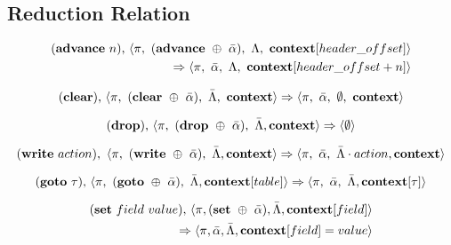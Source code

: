 \documentclass{article}
\begin{document}
\subsection{Reduction Relation}
\setlength{\mathindent}{0pt}
\begin{equation}
\begin{split}
  (\textbf{\textrm{advance}} \ n)\textrm{,} \ \langle \pi, \ (\textrm{\textbf{advance}} \ \oplus \ \bar \alpha), \ \Lambda,
  \ \textrm{\textbf{context}}[header\_offset] \rangle \\ \Rightarrow \langle \pi, \ \bar \alpha, \ \Lambda,
  \ \textrm{\textbf{context}}[header\_offset + n] \rangle
\end{split}
\end{equation}

\begin{equation}
  (\textrm{\textbf{clear}}) \textrm{,} \ \langle \pi, \ (\textbf{\textrm{clear}} \ \oplus \ \bar \alpha), \ \bar \Lambda, \ \textrm{\textbf{context}} \rangle
  \Rightarrow \langle \pi, \ \bar \alpha, \ \emptyset, \  \textrm{\textbf{context}} \rangle
\end{equation}

\begin{equation}  
  (\textrm{\textbf{drop})} \textrm{,} \ \langle \pi, \ (\textrm{\textbf{drop}} \ \oplus \ \bar \alpha), \ \bar \Lambda, \textbf{\textrm{context}} \rangle
  \Rightarrow \langle \emptyset \rangle
\end{equation}

\begin{equation}
  (\textrm{\textbf{write}} \ action), \ \langle \pi, \ (\textrm{\textbf{write}} \ \oplus \ \bar \alpha), \ \bar \Lambda,
  \textrm{\textbf{context}} \rangle \Rightarrow
  \langle \pi, \ \bar \alpha, \ \bar \Lambda \cdot action, \textrm{\textbf{context}} \rangle
\end{equation}

\begin{equation}
  (\textrm{\textbf{goto}} \ \tau) \textrm{,} \ \langle \pi, \ (\textrm{\textbf{goto}} \ \oplus \ \bar \alpha), \ \bar \Lambda, \textrm{\textbf{context}}[table] \rangle
  \Rightarrow \langle \pi, \ \bar \alpha, \ \bar \Lambda, \textrm{\textbf{context}}[\tau] \rangle
\end{equation}

\begin{equation}
\begin{split}
  (\textrm{\textbf{set}} \ field \ value) \textrm{,} \ \langle \pi, (\textrm{\textbf{set}} \ \oplus \ \bar \alpha), \bar \Lambda,
  \textbf{\textrm{context}}[field] \rangle \\
  \Rightarrow \langle \pi, \bar \alpha, \bar \Lambda,
  \textbf{\textrm{context}}[field] = value \rangle
\end{split}
\end{equation}
\end{document}
